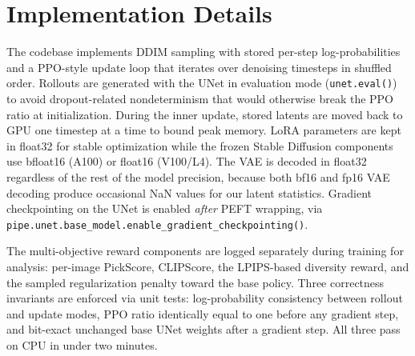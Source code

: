 \documentclass[10pt,letterpaper]{article}
\begin{document}
\section{Implementation Details}
\label{sec:appendix-impl}

The codebase implements DDIM sampling with stored per-step log-probabilities and a PPO-style update loop that iterates over denoising timesteps in shuffled order. Rollouts are generated with the UNet in evaluation mode (\texttt{unet.eval()}) to avoid dropout-related nondeterminism that would otherwise break the PPO ratio at initialization. During the inner update, stored latents are moved back to GPU one timestep at a time to bound peak memory. LoRA parameters are kept in float32 for stable optimization while the frozen Stable Diffusion components use bfloat16 (A100) or float16 (V100/L4). The VAE is decoded in float32 regardless of the rest of the model precision, because both bf16 and fp16 VAE decoding produce occasional NaN values for our latent statistics. Gradient checkpointing on the UNet is enabled \emph{after} PEFT wrapping, via \texttt{pipe.unet.base\_model.enable\_gradient\_checkpointing()}.

The multi-objective reward components are logged separately during training for analysis: per-image PickScore, CLIPScore, the LPIPS-based diversity reward, and the sampled regularization penalty toward the base policy. Three correctness invariants are enforced via unit tests: log-probability consistency between rollout and update modes, PPO ratio identically equal to one before any gradient step, and bit-exact unchanged base UNet weights after a gradient step. All three pass on CPU in under two minutes.
\end{document}

